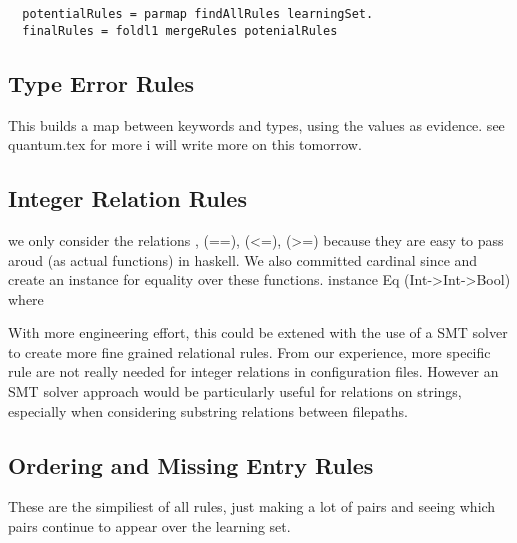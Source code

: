 \begin{lstlisting}
  potentialRules = parmap findAllRules learningSet.
  finalRules = foldl1 mergeRules potenialRules
\end{lstlisting}

\subsection{Type Error Rules}
This builds a map between keywords and types, using the values as evidence.
see quantum.tex for more
i will write more on this tomorrow.

\subsection{Integer Relation Rules}
we only consider the relations , (==), (<=), (>=) because they are easy to pass aroud (as actual functions) in haskell.
We also committed cardinal since and create an instance for equality over these functions.
instance Eq (Int->Int->Bool) where

With more engineering effort, this could be extened with the use of a SMT solver to create more fine grained relational rules.
From our experience, more specific rule are not really needed for integer relations in configuration files.
However an SMT solver approach would be particularly useful for relations on strings, especially when considering substring relations between filepaths.

\subsection{Ordering and Missing Entry Rules}
These are the simpiliest of all rules, just making a lot of pairs and seeing which pairs continue to appear over the learning set.
